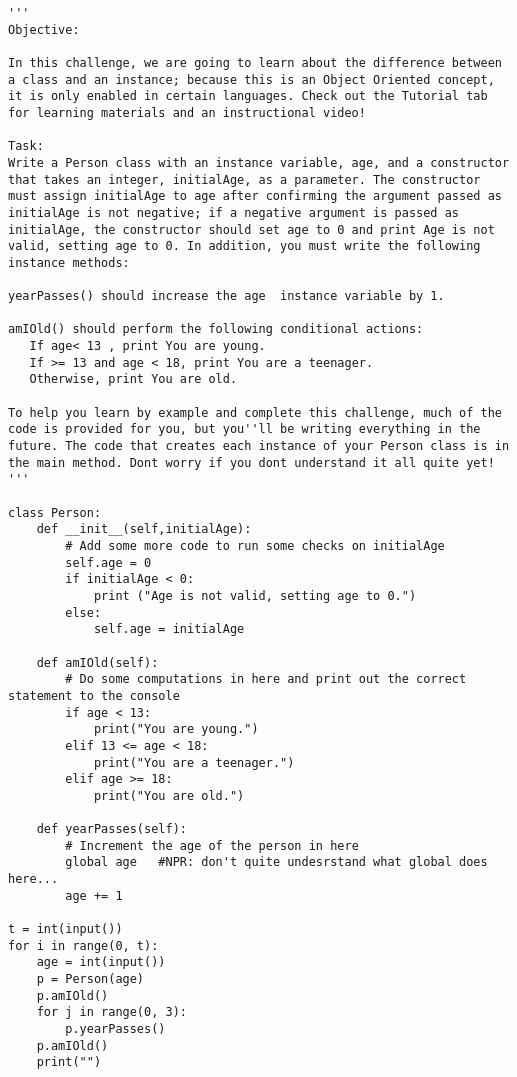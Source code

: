 \documentclass[11pt,a4paper]{article}
\begin{document}
\begin{lstlisting}
'''
Objective:

In this challenge, we are going to learn about the difference between a class and an instance; because this is an Object Oriented concept, it is only enabled in certain languages. Check out the Tutorial tab for learning materials and an instructional video!

Task: 
Write a Person class with an instance variable, age, and a constructor that takes an integer, initialAge, as a parameter. The constructor must assign initialAge to age after confirming the argument passed as initialAge is not negative; if a negative argument is passed as initialAge, the constructor should set age to 0 and print Age is not valid, setting age to 0. In addition, you must write the following instance methods:

yearPasses() should increase the age  instance variable by 1.

amIOld() should perform the following conditional actions:
   If age< 13 , print You are young.
   If >= 13 and age < 18, print You are a teenager.
   Otherwise, print You are old.

To help you learn by example and complete this challenge, much of the code is provided for you, but you''ll be writing everything in the future. The code that creates each instance of your Person class is in the main method. Dont worry if you dont understand it all quite yet!
'''

class Person:
    def __init__(self,initialAge):
        # Add some more code to run some checks on initialAge
        self.age = 0
        if initialAge < 0:
            print ("Age is not valid, setting age to 0.")
        else:
            self.age = initialAge
            
    def amIOld(self):
        # Do some computations in here and print out the correct statement to the console
        if age < 13:
            print("You are young.")
        elif 13 <= age < 18:
            print("You are a teenager.")
        elif age >= 18:
            print("You are old.")
        
    def yearPasses(self):
        # Increment the age of the person in here
        global age   #NPR: don't quite undesrstand what global does here...
        age += 1

t = int(input())
for i in range(0, t):
    age = int(input())         
    p = Person(age)  
    p.amIOld()
    for j in range(0, 3):
        p.yearPasses()       
    p.amIOld()
    print("")
\end{lstlisting}
\end{document}
